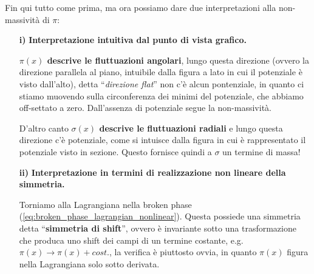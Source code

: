 \documentclass[../main.tex]{subfiles}
\begin{document}
Fin qui tutto come prima, ma ora possiamo dare due interpretazioni alla non-massività di $\pi$:
\begin{enumerate}
    \item[\textbf{i)}] \textbf{Interpretazione intuitiva dal punto di vista grafico.}
    
    \textbf{$\pi(x)$ descrive le fluttuazioni angolari}, lungo questa direzione (ovvero la direzione parallela al piano, intuibile dalla figura a lato in cui il potenziale è visto dall'alto), detta “\textit{direzione flat}” non c'è alcun pontenziale, in quanto ci stiamo muovendo sulla circonferenza dei minimi del potenziale, che abbiamo off-settato a zero. Dall'assenza di potenziale segue la non-massività.

    D'altro canto \textbf{$\sigma(x)$ descrive le fluttuazioni radiali} e lungo questa direzione c'è potenziale, come si intuisce dalla figura in cui è rappresentato il potenziale visto in sezione. Questo fornisce quindi a $\sigma$ un termine di massa!
    
    \item[\textbf{ii)}] \textbf{Interpretazione in termini di realizzazione non lineare della simmetria.}

    Torniamo alla Lagrangiana nella broken phase (\ref{eq:broken_phase_lagrangian_nonlinear}). Questa possiede una simmetria detta “\textbf{simmetria di shift}”, ovvero è invariante sotto una trasformazione che produca uno shift dei campi di un termine costante, e.g. $\pi(x)\rightarrow \pi(x) + cost.$, la verifica è piuttosto ovvia, in quanto $\pi(x)$ figura nella Lagrangiana solo sotto derivata.


\end{enumerate}
\end{document}
